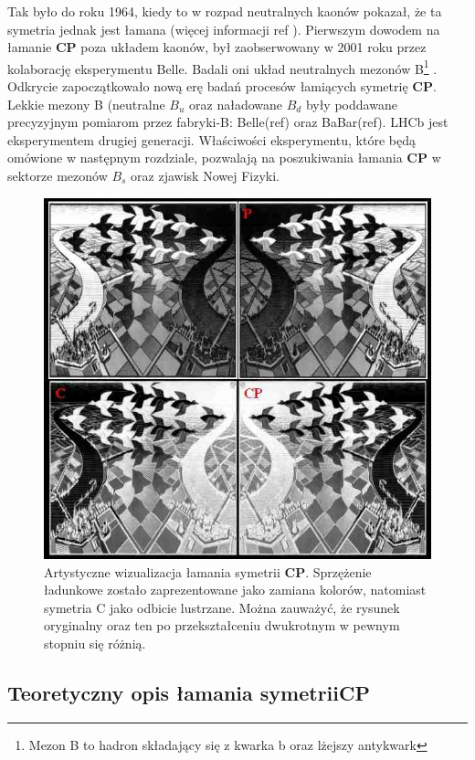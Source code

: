 Tak było do roku 1964, kiedy to w rozpad neutralnych kaonów pokazał, że ta symetria jednak jest łamana (więcej informacji ref ). Pierwszym dowodem na łamanie  \textbf{CP} poza układem kaonów, był zaobserwowany w 2001 roku przez kolaborację eksperymentu Belle. Badali oni układ neutralnych mezonów B\footnote{Mezon B to hadron składający się z kwarka b oraz lżejszy antykwark } . Odkrycie zapoczątkowało nową erę badań procesów łamiących symetrię  \textbf{CP}. Lekkie mezony B (neutralne $B_u$ oraz naładowane $B_d$ były poddawane precyzyjnym pomiarom przez fabryki-B: Belle(ref) oraz BaBar(ref). LHCb jest eksperymentem drugiej generacji. Właściwości eksperymentu, które będą omówione w następnym rozdziale, pozwalają na poszukiwania łamania \textbf{CP}  w sektorze mezonów $B_{s}$ oraz zjawisk Nowej Fizyki.
 \begin{figure}[ht]
 \centering
 \includegraphics[scale=0.7]{rozdzial1/CPV.jpg}
 \caption{Artystyczne wizualizacja łamania symetrii \textbf{CP}. Sprzężenie ładunkowe zostało zaprezentowane jako zamiana kolorów, natomiast symetria C jako odbicie lustrzane. Można zauważyć, że rysunek oryginalny oraz ten po przekształceniu dwukrotnym w pewnym stopniu się różnią.}
 \label{fig:CP}
\end{figure}
 
\subsection{Teoretyczny opis łamania symetrii\textbf{CP} }

